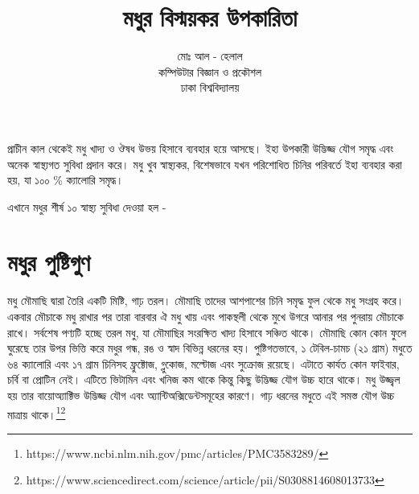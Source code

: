 \documentclass[a4paper,12pt]{article}
\begin{document}
\title{মধুর বিস্ময়কর উপকারিতা}
\author{মোঃ আল - হেলাল\\ কম্পিউটার বিজ্ঞান ও প্রকৌশল\\ ঢাকা বিশ্ববিদ্যালয়}
\maketitle
প্রাচীন কাল থেকেই মধু খাদ্য ও ঔষধ উভয় হিসাবে ব্যবহার হয়ে আসছে।  ইহা উপকারী উদ্ভিজ্জ যৌগ সমৃদ্ধ এবং অনেক স্বাস্থ্যগত সুবিধা প্রদান করে। মধু খুব স্বাস্থ্যকর, বিশেষভাবে  যখন পরিশোধিত চিনির পরিবর্তে ইহা ব্যবহার করা হয়, যা ১০০ \% ক্যালোরি সমৃদ্ধ।

এখানে মধুর শীর্ষ ১০ স্বাস্থ্য সুবিধা দেওয়া হল -
\section{মধুর পুষ্টিগুণ}
মধু মৌমাছি দ্বারা তৈরি একটি মিষ্টি, গাঢ় তরল। মৌমাছি তাদের আশপাশের চিনি সমৃদ্ধ ফুল থেকে মধু সংগ্রহ করে। একবার মৌচাকে মধু রাখার পর তারা বারবার ঐ মধু খায় এবং পাকস্থলী থেকে মুখে উগরে আনার পর পুনরায় মৌচাকে রাখে। সর্বশেষ পণ্যটি হচ্ছে তরল মধু, যা মৌমাছির সংরক্ষিত খাদ্য হিসাবে সঞ্চিত থাকে।  মৌমাছি কোন কোন ফুলে ঘুরেছে তার উপর ভিত্তি করে মধুর গন্ধ, রঙ ও স্বাদ বিভিন্ন ধরনের হয়।
পুষ্টিগতভাবে, ১ টেবিল-চামচ (২১ গ্রাম) মধুতে ৬৪ ক্যালোরি এবং ১৭ গ্রাম চিনিসহ ফ্রুক্টোজ, গ্লুকোজ, মল্টোজ এবং সুক্রোজ রয়েছে। এটাতে কার্যত কোন ফাইবার, চর্বি বা প্রোটিন নেই। এটিতে ভিটামিন এবং খনিজ কম থাকে কিন্তু কিছু উদ্ভিজ্জ যৌগ উচ্চ হারে থাকে। মধু উজ্জ্বল হয় তার বায়োঅ্যাক্টিভ উদ্ভিজ্জ যৌগ এবং অ্যান্টিঅক্সিডেন্টসমূহের কারণে। গাঢ় ধরনের মধুতে এই সমস্ত যৌগ উচ্চ মাত্রায় থাকে।\footnote{https://www.ncbi.nlm.nih.gov/pmc/articles/PMC3583289/}\footnote{https://www.sciencedirect.com/science/article/pii/S0308814608013733}
\end{document}

